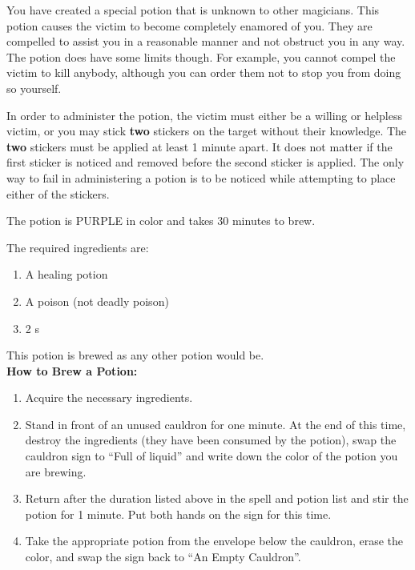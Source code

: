 \documentclass[green]{NeptuneBall}
\begin{document}
\name{\gLove{}}

You have created a special potion that is unknown to other magicians. This potion causes the victim to become completely enamored of you. They are compelled to assist you in a reasonable manner and not obstruct you in any way. The potion does have some limits though. For example, you cannot compel the victim to kill anybody, although you can order them not to stop you from doing so yourself.

In order to administer the potion, the victim must either be a willing or helpless victim, or you may stick {\bf two} stickers on the target without their knowledge. The {\bf two} stickers must be applied at least 1 minute apart. It does not matter if the first sticker is noticed and removed before the second sticker is applied. The only way to fail in administering a potion is to be noticed while attempting to place either of the stickers.

The potion is PURPLE in color and takes 30 minutes to brew.

The required ingredients are:
\begin{enumerate}
\item A healing potion 
\item A poison (not deadly poison)
\item 2 \iPearl{}s
\end{enumerate}

This potion is brewed as any other potion would be.\\

{\bf How to Brew a Potion:}\\ %
\begin{enumerate}
  \item Acquire the necessary ingredients.
  \item Stand in front of an unused cauldron for one minute. At the end of this time, destroy the ingredients (they have been consumed by the potion), swap the cauldron sign to ``Full of liquid'' and write down the color of the potion you are brewing.
  \item Return after the duration listed above in the spell and potion list and stir the potion for 1 minute. Put both hands on the sign for this time.
  \item Take the appropriate potion from the envelope below the cauldron, erase the color, and swap the sign back to ``An Empty Cauldron''.
\end{enumerate}
\end{document}
